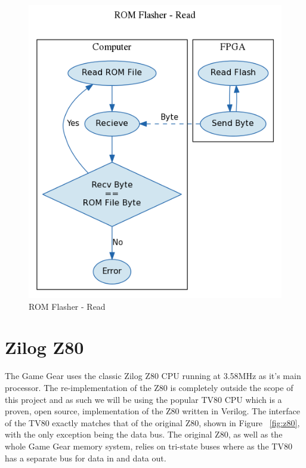 \documentclass{article}
\begin{document}
\begin{figure}[H]
\begin{minipage}[H]{0.45\linewidth}
        \includegraphics[width=\textwidth]{../../fpga/rom_flasher/doc/block_diagram_read.png}
        \caption{ROM Flasher - Read}
        \label{fig:rom_read}
    \end{minipage}
\end{figure}



\section{Zilog Z80}
The Game Gear uses the classic Zilog Z80 CPU running at 3.58MHz 
as it's main processor.
The re-implementation of the Z80 is completely outside the scope of
this project and as such we will be using the popular TV80 \cite{tv80}
CPU which is a proven, open source, implementation of the Z80
written in Verilog. The interface of the TV80 exactly matches that of
the original Z80, shown in Figure ~\ref{fig:z80}, with the only
exception being the data bus. The original Z80, as well as the whole
Game Gear memory system, relies on tri-state buses where as the TV80 has
a separate bus for data in and data out. 
\end{document}
